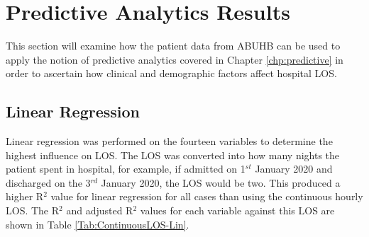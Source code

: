 \documentclass[../thesis.tex]{subfiles}
\begin{document}
\section{Predictive Analytics Results}\label{sec:predictiveresults}
This section will examine how the patient data from ABUHB can be used to apply the notion of predictive analytics covered in Chapter \ref{chp:predictive} in order to ascertain how clinical and demographic factors affect hospital LOS.

\subsection{Linear Regression}\label{sec:linregresults}
Linear regression was performed on the fourteen variables to determine the highest influence on LOS. The LOS was converted into how many nights the patient spent in hospital, for example, if admitted on 1$^{st}$ January 2020 and discharged on the 3$^{rd}$ January 2020, the LOS would be two. This produced a higher R$^{2}$ value for linear regression for all cases than using the continuous hourly LOS. The R$^{2}$ and adjusted R$^{2}$ values for each variable against this LOS are shown in  Table \ref{Tab:ContinuousLOS-Lin}.



\begin{table}[h!]
\centering{}
\caption{Linear Regression Result}
\label{Tab:ContinuousLOS-Lin}
\end{table}
\end{document}
